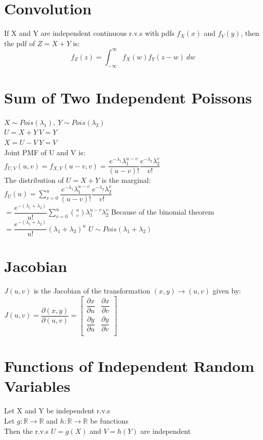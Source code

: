 \documentclass[openany]{book}
\begin{document}
\begin{flushleft}
\section{Convolution}
If X and Y are independent continuous r.v.s with pdfs $f_X(x)$ and $f_Y(y)$, then the pdf of $Z=X+Y$ is:
\[f_Z(z)=\int_{-\infty}^{\infty}f_X(w)f_Y(z-w)\ dw
\]
\section{Sum of Two Independent Poissons}
$X\sim Pois(\lambda_1), \ Y\sim Pois(\lambda_2)$\\
$U=X+Y \ V=Y$\\
$X=U-V \ Y=V$\\
Joint PMF of U and V is:\\
$f_{U,V}(u,v)=f_{X,Y}(u-v,v)=\dfrac{e^{-\lambda_1}\lambda_1^{u-v}}{(u-v)!}\dfrac{e^{-\lambda_2}\lambda_2^v}{v!}$\\
The distribution of $U=X+Y$ is the marginal:\\
$f_U(u)=\sum_{v=0}^{u}\dfrac{e^{-\lambda_1}\lambda_1^{u-v}}{(u-v)!}\dfrac{e^{-\lambda_2}\lambda_2^v}{v!}$\\
$=\dfrac{e^{-(\lambda_1+\lambda_2)}}{u!}\sum_{v=0}^{u} {u \choose v}\lambda_1^{u-v}\lambda_2^v$\medbreak
Because of the binomial theorem\medbreak
$=\dfrac{e^{-(\lambda_1+\lambda_2)}}{u!}(\lambda_1+\lambda_2)^u$\medbreak
$U\sim Pois(\lambda_1+\lambda_2)$
\section{Jacobian}
$J(u,v)$ is the Jacobian of the transformation $(x,y)\to (u,v)$ given by:\medbreak
$J(u,v)=\dfrac{\partial(x,y)}{\partial(u,v)}=
\begin{bmatrix}
\dfrac{\partial x}{\partial u}& \dfrac{\partial x}{\partial v}\\
\dfrac{\partial y}{\partial u}& \dfrac{\partial y}{\partial v}\\
\end{bmatrix}$
\section{Functions of Independent Random Variables}
Let X and Y be independent r.v.s\\
Let $g:\mathbb{R}\to \mathbb{R}$ and $h:\mathbb{R}\to \mathbb{R}$ be functions\\
Then the r.v.s $U=g(X)$ and $V=h(Y)$ are independent

\end{flushleft}
\end{document}
